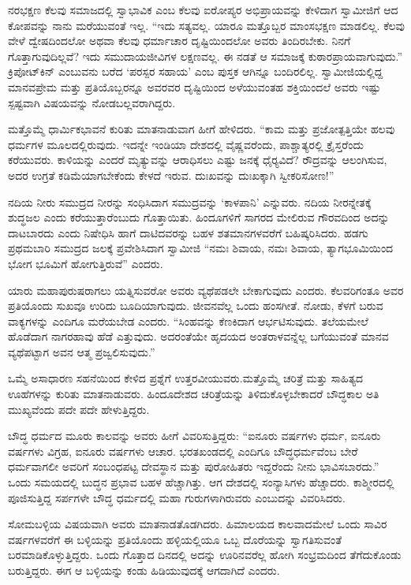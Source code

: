  ನರಭಕ್ಷಣ ಕೆಲವು ಸಮಾಜದಲ್ಲಿ ಸ್ವಾಭಾವಿಕ ಎಂಬ ಕೆಲವು ಐರೋಪ್ಯರ ಅಭಿಪ್ರಾಯವನ್ನು ಕೇಳಿದಾಗ ಸ್ವಾಮೀಜಿಗೆ ಆದ ಕೋಪವನ್ನು ನಾನು ಮರೆಯುವಂತೆ ಇಲ್ಲ. “ಇದು ಸತ್ಯವಲ್ಲ. ಯಾರೂ ಮತ್ತೊಬ್ಬರ ಮಾಂಸಭಕ್ಷಣ ಮಾಡಲಿಲ್ಲ. ಕೆಲವು ವೇಳೆ ದ್ವೇಷದಿಂದಲೋ ಅಥವಾ ಕೆಲವು ಧರ್ಮಾಚಾರ ದೃಷ್ಟಿಯಿಂದಲೋ ಅವರು ತಿಂದಿರಬೇಕು. ನಿನಗೆ ಗೊತ್ತಾಗುವುದಿಲ್ಲವೆ? ಇದು ಸಮುದಾಯಜೀವಿಗಳ ಲಕ್ಷಣವಲ್ಲ. ಈ ನಡತೆ ಆ ಸಮಾಜಕ್ಕೆ ಕುಠಾರಪ್ರಾಯವಾಗುವುದು.” ಕ್ರಿಪೋಟ್‌ಕಿನ್ ಎಂಬುವನು ಬರೆದ ‘ಪರಸ್ಪರ ಸಹಾಯ’ ಎಂಬ ಪುಸ್ತಕ ಆಗಿನ್ನೂ ಬಂದಿರಲಿಲ್ಲ. ಸ್ವಾಮೀಜಿಯಲ್ಲಿದ್ದ ಮಾನವಪ್ರೇಮ ಮತ್ತು ಪ್ರತಿಯೊಬ್ಬರನ್ನೂ ಅವರವರ ದೃಷ್ಟಿಯಿಂದ ಅಳೆಯುವಂತಹ ಶಕ್ತಿಯಿಂದಲೆ ಅವರು ಇಷ್ಟು ಸ್ಪಷ್ಟವಾಗಿ ವಿಷಯವನ್ನು ನೋಡಬಲ್ಲವರಾಗಿದ್ದರು. 

 ಮತ್ತೊಮ್ಮೆ ಧಾರ್ಮಿಕಭಾವನೆ ಕುರಿತು ಮಾತನಾಡುವಾಗ ಹೀಗೆ ಹೇಳಿದರು. “ಕಾಮ ಮತ್ತು ಪ್ರಜೋತ್ಪತ್ತಿಯೇ ಹಲವು ಧರ್ಮಗಳ ಮೂಲದಲ್ಲಿರುವುದು. ಇದನ್ನೇ ಇಂಡಿಯಾ ದೇಶದಲ್ಲಿ ವೈಷ್ಣವರೆಂದು, ಪಾಶ್ಚಾತ್ಯರಲ್ಲಿ ಕ್ರೈಸ್ತರೆಂದು ಕರೆಯುವರು. ಕಾಳಿಯನ್ನು ಎಂದರೆ ಮೃತ್ಯುವನ್ನು ಆರಾಧಿಸಲು ಎಷ್ಟು ಜನಕ್ಕೆ ಧೈರ‍್ಯವಿದೆ? ರೌದ್ರವನ್ನು ಆಲಂಗಿಸುವ, ಅದರ ಉಗ್ರತೆ ಕಡಿಮೆಯಾಗಬೇಕೆಂದು ಕೇಳದೆ ಇರುವ. ದುಃಖವನ್ನು ದುಃಖಕ್ಕಾಗಿ ಸ್ವೀಕರಿಸೋಣ!” 

 ನದಿಯ ನೀರು ಸಮುದ್ರದ ನೀರನ್ನು ಸಂಧಿಸಿದಾಗ ಸಮುದ್ರವನ್ನು ‘ಕಾಳಪಾನಿ’ ಎನ್ನುವರು. ನದಿಯ ನೀರನ್ನೇತಕ್ಕೆ ಶುದ್ಧಜಲ ಎಂದು ಕರೆಯುತ್ತಾರೆಂಬುದು ಗೊತ್ತಾಯಿತು. ಹಿಂದೂಗಳಿಗೆ ಸಾಗರದ ಮೇಲಿರುವ ಗೌರವದಿಂದ ಅದನ್ನು ದಾಟಬಾರದು ಎಂದು ನಿಷೇಧಿಸಿ ಹಾಗೆ ದಾಟಿದವರನ್ನು ಬಹಳ ಶತಮಾನಗಳವರೆಗೆ ಬಹಿಷ್ಕರಿಸಿದರು. ಹಡಗು ಪ್ರಥಮಬಾರಿ ಸಮುದ್ರದ ಜಲಕ್ಕೆ ಪ್ರವೇಶಿಸಿದಾಗ ಸ್ವಾಮೀಜಿ “ನಮಃ ಶಿವಾಯ, ನಮಃ ಶಿವಾಯ, ತ್ಯಾಗಭೂಮಿಯಿಂದ ಭೋಗ ಭೂಮಿಗೆ ಹೋಗುತ್ತಿರುವೆ” ಎಂದರು. 

 ಯಾರು ಮಹಾಪುರುಷರಾಗಲು ಯತ್ನಿಸುವರೋ ಅವರು ವ್ಯಥೆಪಡಲೇ ಬೇಕಾಗುವುದು ಎಂದರು. ಕೆಲವರಿಗಂತೂ ಅವರ ಪ್ರತಿಯೊಂದು ಸುಖವೂ ಉರಿದು ಬೂದಿಯಾಗುವುದು. ಜೀವನವೆಲ್ಲ ಒಂದು ಹಂಸಗೀತೆ. ನೋಡು, ಕೆಳಗೆ ಬರುವ ವಾಕ್ಯಗಳನ್ನು ಎಂದಿಗೂ ಮರೆಯಬೇಡ ಎಂದರು. “ಸಿಂಹವನ್ನು ಕೆಣಕಿದಾಗ ಆರ್ಭಟಿಸುವುದು. ತಲೆಯಮೇಲೆ ಹೊಡೆದಾಗ ನಾಗರಹಾವು ಹೆಡೆ ಎತ್ತುವುದು. ಅದರಂತೆಯೇ ಹೃದಯದ ಅಂತರಾಳವನ್ನೆಲ್ಲ ಬಗೆಯುವಂತೆ ಮಾನವ ವ್ಯಥೆಪಟ್ಟಾಗ ಅವನ ಆತ್ಮ ಪ್ರಜ್ವಲಿಸುವುದು.” 

 ಒಮ್ಮೆ ಅಸಾಧಾರಣ ಸಹನೆಯಿಂದ ಕೇಳಿದ ಪ್ರಶ್ನೆಗೆ ಉತ್ತರವೀಯುವರು.\break ಮತ್ತೊಮ್ಮೆ ಚರಿತ್ರೆ ಮತ್ತು ಸಾಹಿತ್ಯದ ಊಹೆಗಳನ್ನು ಕುರಿತು ಮಾತನಾಡುವರು. ಹಿಂದೂದೇಶದ ಚರಿತ್ರೆಯನ್ನು ತಿಳಿದುಕೊಳ್ಳಬೇಕಾದರೆ ಬೌದ್ಧಕಾಲ ಅತಿ ಮುಖ್ಯವೆಂದು ಪದೇ ಪದೇ ಹೇಳುತ್ತಿದ್ದರು. 

 ಬೌದ್ಧ ಧರ್ಮದ ಮೂರು ಕಾಲವನ್ನು ಅವರು ಹೀಗೆ ವಿವರಿಸುತ್ತಿದ್ದರು: “ಐನೂರು ವರ್ಷಗಳು ಧರ್ಮ, ಐನೂರು ವರ್ಷಗಳು ವಿಗ್ರಹ, ಐನೂರು ವರ್ಷಗಳು ಆಚಾರ. ಭರತಖಂಡದಲ್ಲಿ ಎಂದಿಗೂ ಬೌದ್ಧಧರ್ಮವೆಂಬ ಬೇರೆ ಧರ್ಮವಾಗಲೀ ಅವರಿಗೆ ಸಂಬಂಧಪಟ್ಟ ದೇವಸ್ಥಾನ ಮತ್ತು ಪುರೋಹಿತರು ಇದ್ದರೆಂದು ನೀನು ಭಾವಿಸಬಾರದು.” ಒಂದು ಸಮಯದಲ್ಲಿ ಬುದ್ಧನ ಪ್ರಭಾವ ಬಹಳ ಹೆಚ್ಚಾಗಿತ್ತು. ಆಗ ದೇಶದಲ್ಲಿ ಸಂನ್ಯಾಸಿಗಳು ಹೆಚ್ಚಾದರು. ಕಾಶ್ಮೀರದಲ್ಲಿ ಪೂಜಿಸುತ್ತಿದ್ದ ಸರ್ಪಗಳೇ ಬೌದ್ಧ ಧರ್ಮದಲ್ಲಿ ಮಹಾ ಗುರುಗಳಾಗಿರುವರು ಎಂಬುದನ್ನು ವಿವರಿಸಿದರು. 

 ಸೋಮಬಳ್ಳಿಯ ವಿಷಯವಾಗಿ ಅವರು ಮಾತನಾಡತೊಡಗಿದರು. ಹಿಮಾಲಯದ ಕಾಲವಾದಮೇಲೆ ಒಂದು ಸಾವಿರ ವರ್ಷಗಳವರೆಗೆ ಈ ಬಳ್ಳಿಯನ್ನು ಪ್ರತಿಯೊಂದು ಹಳ್ಳಿಯಲ್ಲಿಯೂ ಒಬ್ಬ ದೊರೆಯನ್ನು ಸ್ವಾಗತಿಸುವಂತೆ ಬರಮಾಡಿಕೊಳ್ಳುತ್ತಿದ್ದರು. ಒಂದು ಗೊತ್ತಾದ ದಿನದಲ್ಲಿ ಅದನ್ನು ಊರಿನವರೆಲ್ಲ ಹೋಗಿ ಸಂಭ್ರಮದಿಂದ ತೆಗೆದುಕೊಂಡು ಬರುತ್ತಿದ್ದರು. ಈಗ ಆ ಬಳ್ಳಿಯನ್ನು ಕಂಡು ಹಿಡಿಯುವುದಕ್ಕೆ ಆಗದಾಗಿದೆ ಎಂದರು. 

